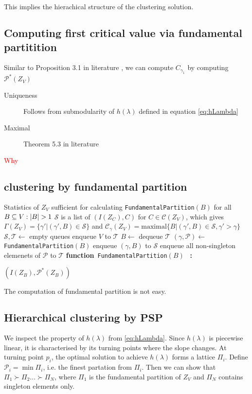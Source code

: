 \documentclass{article}
\makeatletter
\def\P{\mathcal{P}}
\DeclarePairedDelimiter\abs{\lvert}{\rvert}
\def\red#1{\textcolor{red}{#1}}
\newcommand{\algorithmicfunction}{\textbf{function}}
\newcommand{\algorithmicendfunction}{\algorithmicend\ \algorithmicfunction}
\newenvironment{ALC@func}{\begin{ALC@g}}{\end{ALC@g}}
\newcommand{\FUNCTION}[2][default]{\ALC@it\algorithmicfunction\ #2\ %
\textbf{:}%
\ALC@com{#1}\begin{ALC@func}}
\newcommand{\ENDFUNCTION}{\end{ALC@func}}
\newcommand{\ENDFUNCTION}{\end{ALC@func}\ALC@it\algorithmicendfunction}
\theoremstyle{definition}
\makeatother
\begin{document}
This implies the hierachical structure of the clustering solution.
\subsection{Computing first critical value via fundamental partitition}
Similar to Proposition 3.1 in literature \cite{ic}, we can compute $C_{\gamma_1}$ by computing $\P^*(Z_V)$
\begin{description}
\item[Uniqueness] Follows from submodularity of  $h(\lambda)$ defined in equation \eqref{eq:hLambda}
\item[Maximal] Theorem 5.3 in literature \cite{ska}
\end{description}
\red{Why}

\subsection{clustering by fundamental partition}
\begin{algorithm}
\begin{algorithmic}[1]
\REQUIRE Statistics of $Z_V$ sufficient for calculating \texttt{FundamentalPartition}$(B)$ for all $B \subseteq V:\abs{B}>1$
\ENSURE $\mathcal{S}$ is a list of $(I(Z_C),C)$ for $ C \in \mathcal{C}(Z_V)$, which gives
$\Gamma(Z_V) = \{ \gamma' | (\gamma', B) \in \mathcal{S}\} $ and $ \mathcal{C}_{\gamma}(Z_V)
= \mathrm{maximal}\{B | (\gamma', B) \in \mathcal{S}, \gamma' > \gamma \}$
\STATE $\mathcal{S},\mathcal{T} \leftarrow$ empty queues
\STATE enqueue $V$ to $\mathcal{T}$
\STATE $B \leftarrow $ dequeue $\mathcal{T}$
\STATE $(\gamma, \P) \leftarrow$\texttt{FundamentalPartition}$(B)$
\STATE enqueue $(\gamma, B)$ to $\mathcal{S}$
\STATE enqueue all non-singleton elemenets of $\P$ to $\mathcal{T}$
\ENDWHILE
\FUNCTION{\texttt{FundamentalPartition}$(B)$}
  \RETURN $(I(Z_B), \P^*(Z_B))$
\ENDFUNCTION
\end{algorithmic}
\end{algorithm}

The computation of fundamental partition is not easy.
\subsection{Hierarchical clustering by PSP}
We inspect the property of $h(\lambda)$ from \eqref{eq:hLambda}. Since $h(\lambda)$ is piecewise linear, it is characterised by its turning points where the slope changes.
At turning point $p_i$, the optimal solution to achieve $h(\lambda)$ forms a lattice $\Pi_i$.
Define $\mathcal{P}_i = \min \Pi_i$, i.e. the finest partation from $\Pi_i$. Then we can show that
$\Pi_1 \succ \Pi_2 \dots \succ \Pi_N$, where $\Pi_1$ is the fundamental partition of $Z_V$ and $\Pi_N$ contains singleton elements only.
\end{document}
